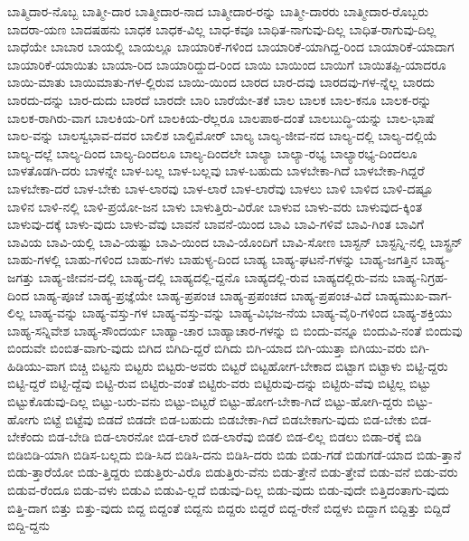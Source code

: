 {ಬಾತ್ಮಿದಾರ-ನೊಬ್ಬ
ಬಾತ್ಮೀ-ದಾರ
ಬಾತ್ಮೀದಾರ-ನಾದ
ಬಾತ್ಮೀದಾರ-ರನ್ನು
ಬಾತ್ಮೀ-ದಾರರು
ಬಾತ್ಮೀದಾರ-ರೊಬ್ಬರು
ಬಾದರಾ-ಯಣ
ಬಾದಷಹನು
ಬಾಧಕ
ಬಾಧಕ-ವಿಲ್ಲ
ಬಾಧ-ಕವೂ
ಬಾಧಿತ-ನಾಗುವು-ದಿಲ್ಲ
ಬಾಧಿತ-ರಾಗುವು-ದಿಲ್ಲ
ಬಾಧೆಯೇ
ಬಾಬಾರ
ಬಾಯಲ್ಲಿ
ಬಾಯಲ್ಲೂ
ಬಾಯಾರಿಕೆ-ಗಳಿಂದ
ಬಾಯಾರಿಕೆ-ಯಾಗಿದ್ದ-ರಿಂದ
ಬಾಯಾರಿಕೆ-ಯಾದಾಗ
ಬಾಯಾರಿಕೆ-ಯಾಯಿತು
ಬಾಯಾ-ರಿದ
ಬಾಯಾರಿದ್ದುದ-ರಿಂದ
ಬಾಯಿ
ಬಾಯಿಂದ
ಬಾಯಿಗೆ
ಬಾಯಿತಪ್ಪಿ-ಯಾದರೂ
ಬಾಯಿ-ಮಾತು
ಬಾಯಿಮಾತು-ಗಳ-ಲ್ಲಿರುವ
ಬಾಯಿ-ಯಿಂದ
ಬಾರದ
ಬಾರ-ದವು
ಬಾರದವು-ಗಳ-ನ್ನೆಲ್ಲ
ಬಾರದು
ಬಾರದು-ದನ್ನು
ಬಾರ-ದುದು
ಬಾರದೆ
ಬಾರದೇ
ಬಾರಿ
ಬಾರೆಯೇ-ತಕೆ
ಬಾಲ
ಬಾಲಕ
ಬಾಲ-ಕನೂ
ಬಾಲಕ-ರನ್ನು
ಬಾಲಕ-ರಾಗಿರು-ವಾಗ
ಬಾಲಕಿಯ-ರಿಗೆ
ಬಾಲಕಿಯ-ರೆಲ್ಲರೂ
ಬಾಲಪಾಠ-ದಂತೆ
ಬಾಲಬುದ್ಧಿ-ಯನ್ನು
ಬಾಲ-ಭಾಷೆ
ಬಾಲ-ವನ್ನು
ಬಾಲಸ್ವಭಾವ-ದವರ
ಬಾಲಿಶ
ಬಾಲ್ಟಿಮೋರ್
ಬಾಲ್ಯ
ಬಾಲ್ಯ-ಜೀವ-ನದ
ಬಾಲ್ಯ-ದಲ್ಲಿ
ಬಾಲ್ಯ-ದಲ್ಲಿಯೆ
ಬಾಲ್ಯ-ದಲ್ಲೆ
ಬಾಲ್ಯ-ದಿಂದ
ಬಾಲ್ಯ-ದಿಂದಲೂ
ಬಾಲ್ಯ-ದಿಂದಲೇ
ಬಾಲ್ಯಾ
ಬಾಲ್ಯಾ-ರಭ್ಯ
ಬಾಲ್ಯಾರಭ್ಯ-ದಿಂದಲೂ
ಬಾಳತೊಡಗಿ-ದರು
ಬಾಳನ್ನೇ
ಬಾಳ-ಬಲ್ಲ
ಬಾಳ-ಬಲ್ಲವು
ಬಾಳ-ಬಹುದು
ಬಾಳಬೇಕಾ-ಗಿದೆ
ಬಾಳಬೇಕಾ-ಗಿದ್ದರೆ
ಬಾಳಬೇಕಾ-ದರೆ
ಬಾಳ-ಬೇಕು
ಬಾಳ-ಲಾರವು
ಬಾಳ-ಲಾರೆ
ಬಾಳ-ಲಾರೆವು
ಬಾಳಲು
ಬಾಳಿ
ಬಾಳಿದ
ಬಾಳಿ-ದಷ್ಟೂ
ಬಾಳಿನ
ಬಾಳಿ-ನಲ್ಲಿ
ಬಾಳಿ-ಪ್ರಯೋ-ಜನ
ಬಾಳು
ಬಾಳುತ್ತಿರು-ವಿರೋ
ಬಾಳುವ
ಬಾಳು-ವರು
ಬಾಳುವುದ-ಕ್ಕಿಂತ
ಬಾಳುವು-ದಕ್ಕೆ
ಬಾಳು-ವುದು
ಬಾಳು-ವೆವು
ಬಾವನೆ
ಬಾವನೆ-ಯಿಂದ
ಬಾವಿ
ಬಾವಿ-ಗಳಿವೆ
ಬಾವಿ-ಗಿಂತ
ಬಾವಿಗೆ
ಬಾವಿಯ
ಬಾವಿ-ಯಲ್ಲಿ
ಬಾವಿ-ಯಷ್ಟು
ಬಾವಿ-ಯಿಂದ
ಬಾವಿ-ಯೊಂದಿಗೆ
ಬಾವಿ-ಸೋಣ
ಬಾಸ್ಟನ್
ಬಾಸ್ಟನ್ನಿ-ನಲ್ಲಿ
ಬಾಸ್ಟ್ರನ್
ಬಾಹು-ಗಳಲ್ಲಿ
ಬಾಹು-ಗಳಿಂದ
ಬಾಹು-ಗಳು
ಬಾಹುಳ್ಯ-ದಿಂದ
ಬಾಹ್ಯ
ಬಾಹ್ಯ-ಘಟನೆ-ಗಳನ್ನು
ಬಾಹ್ಯ-ಜಗತ್ತಿನ
ಬಾಹ್ಯ-ಜಗತ್ತು
ಬಾಹ್ಯ-ಜೀವನ-ದಲ್ಲಿ
ಬಾಹ್ಯ-ದಲ್ಲಿ
ಬಾಹ್ಯದಲ್ಲಿ-ದ್ದನೊ
ಬಾಹ್ಯದಲ್ಲಿ-ರುವ
ಬಾಹ್ಯದಲ್ಲಿರು-ವನು
ಬಾಹ್ಯ-ನಿಗ್ರಹ-ದಿಂದ
ಬಾಹ್ಯ-ಪೂಜೆ
ಬಾಹ್ಯ-ಪ್ರಜ್ಞೆಯೇ
ಬಾಹ್ಯ-ಪ್ರಪಂಚ
ಬಾಹ್ಯ-ಪ್ರಪಂಚದ
ಬಾಹ್ಯ-ಪ್ರಪಂಚ-ವಿದೆ
ಬಾಹ್ಯಮುಖ-ವಾಗ-ಲಿಲ್ಲ
ಬಾಹ್ಯ-ವನ್ನು
ಬಾಹ್ಯ-ವಸ್ತು-ಗಳ
ಬಾಹ್ಯ-ವಸ್ತು-ವನ್ನು
ಬಾಹ್ಯ-ವಿಭಜ-ನೆಯ
ಬಾಹ್ಯ-ವೈರಿ-ಗಳಿಂದ
ಬಾಹ್ಯ-ಶಕ್ತಿಯು
ಬಾಹ್ಯ-ಸನ್ನಿವೇಶ
ಬಾಹ್ಯ-ಸೌಂದರ್ಯ
ಬಾಹ್ಯಾ-ಚಾರ
ಬಾಹ್ಯಾಚಾರ-ಗಳನ್ನು
ಬಿ
ಬಿಂದು-ವನ್ನೂ
ಬಿಂದುವಿ-ನಂತೆ
ಬಿಂದುವು
ಬಿಂದುವೇ
ಬಿಂಬಿತ-ವಾಗು-ವುದು
ಬಿಗಿದ
ಬಿಗಿದಿ-ದ್ದರೆ
ಬಿಗಿದು
ಬಿಗಿ-ಯಾದ
ಬಿಗಿ-ಯುತ್ತಾ
ಬಿಗಿಯು-ವರು
ಬಿಗಿ-ಹಿಡಿಯು-ವಾಗ
ಬಿಚ್ಚಿ
ಬಿಟ್ಟನು
ಬಿಟ್ಟರು
ಬಿಟ್ಟರು-ಅವರು
ಬಿಟ್ಟರೆ
ಬಿಟ್ಟಹೋಗ-ಬೇಕಾದ
ಬಿಟ್ಟಾಗ
ಬಿಟ್ಟಾಳು
ಬಿಟ್ಟಿ-ದ್ದರು
ಬಿಟ್ಟಿ-ದ್ದರೆ
ಬಿಟ್ಟಿ-ದ್ದೆವು
ಬಿಟ್ಟಿ-ರುವ
ಬಿಟ್ಟಿರು-ವಂತೆ
ಬಿಟ್ಟಿರು-ವರು
ಬಿಟ್ಟಿರುವು-ದನ್ನು
ಬಿಟ್ಟಿರು-ವೆವು
ಬಿಟ್ಟಿಲ್ಲ
ಬಿಟ್ಟು
ಬಿಟ್ಟುಕೊಡುವು-ದಿಲ್ಲ
ಬಿಟ್ಟು-ಬರು-ವನು
ಬಿಟ್ಟು-ಬಿಟ್ಟರೆ
ಬಿಟ್ಟು-ಹೋಗ-ಬೇಕಾ-ಗಿದೆ
ಬಿಟ್ಟು-ಹೋಗಿ-ದ್ದರು
ಬಿಟ್ಟು-ಹೋಗು
ಬಿಟ್ಟೆ
ಬಿಟ್ಟೆವು
ಬಿಡದೆ
ಬಿಡದೇ
ಬಿಡ-ಬಹುದು
ಬಿಡಬೇಕಾ-ಗಿದೆ
ಬಿಡಬೇಕಾಗು-ವುದು
ಬಿಡ-ಬೇಕು
ಬಿಡ-ಬೇಕೆಂದು
ಬಿಡ-ಬೇಡಿ
ಬಿಡ-ಲಾರನೋ
ಬಿಡ-ಲಾರೆ
ಬಿಡ-ಲಾರೆವು
ಬಿಡಲಿ
ಬಿಡ-ಲಿಲ್ಲ
ಬಿಡಲು
ಬಿಡಾ-ರಕ್ಕೆ
ಬಿಡಿ
ಬಿಡಿಬಿಡಿ-ಯಾಗಿ
ಬಿಡಿಸ-ಬಲ್ಲದು
ಬಿಡಿ-ಸಿದ
ಬಿಡಿಸಿ-ದನು
ಬಿಡಿಸಿ-ದರು
ಬಿಡು
ಬಿಡು-ಗಡೆ
ಬಿಡುಗಡೆ-ಯಾದ
ಬಿಡು-ತ್ತಾನೆ
ಬಿಡು-ತ್ತಾರೆಯೋ
ಬಿಡು-ತ್ತಿದ್ದರು
ಬಿಡುತ್ತಿರು-ವಿರೊ
ಬಿಡುತ್ತಿರು-ವೆನು
ಬಿಡು-ತ್ತೇನೆ
ಬಿಡು-ತ್ತೇವೆ
ಬಿಡು-ವನೆ
ಬಿಡು-ವರು
ಬಿಡುವ-ರೆಂದೂ
ಬಿಡು-ವಳು
ಬಿಡುವಿ
ಬಿಡುವಿ-ಲ್ಲದೆ
ಬಿಡುವು-ದಿಲ್ಲ
ಬಿಡು-ವುದು
ಬಿಡು-ವುದೇ
ಬಿತ್ತಿದಂತಾಗು-ವುದು
ಬಿತ್ತಿ-ದಾಗ
ಬಿತ್ತು
ಬಿತ್ತು-ವುದು
ಬಿದ್ದ
ಬಿದ್ದಂತೆ
ಬಿದ್ದನು
ಬಿದ್ದರು
ಬಿದ್ದರೆ
ಬಿದ್ದ-ರೇನೆ
ಬಿದ್ದಳು
ಬಿದ್ದಾಗ
ಬಿದ್ದಿತ್ತು
ಬಿದ್ದಿದೆ
ಬಿದ್ದಿ-ದ್ದನು
}
